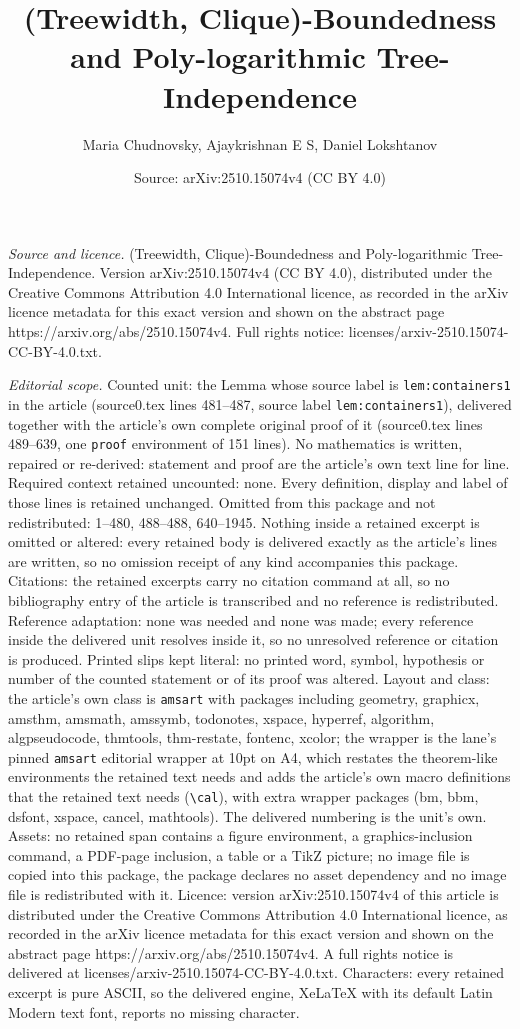 \documentclass[10pt,a4paper]{amsart}
\title[(Treewidth, Clique)-Boundedness and Poly-logarithmic Tree-In]{(Treewidth, Clique)-Boundedness and Poly-logarithmic Tree-Independence}
\author{Maria Chudnovsky, Ajaykrishnan E S, Daniel Lokshtanov}
\date{Source: arXiv:2510.15074v4 (CC BY 4.0)}
\begin{document}
\maketitle

\noindent\emph{Source and licence.} (Treewidth, Clique)-Boundedness and Poly-logarithmic Tree-Independence. Version arXiv:2510.15074v4 (CC BY 4.0), distributed under the Creative Commons Attribution 4.0 International licence, as recorded in the arXiv licence metadata for this exact version and shown on the abstract page https://arxiv.org/abs/2510.15074v4. Full rights notice: licenses/arxiv-2510.15074-CC-BY-4.0.txt.\par\smallskip

\noindent\textit{Editorial scope.} Counted unit: the Lemma whose source label is \texttt{lem:containers1} in the article (source0.tex lines 481--487, source label \texttt{lem:containers1}), delivered together with the article's own complete original proof of it (source0.tex lines 489--639, one \texttt{proof} environment of 151 lines). No mathematics is written, repaired or re-derived: statement and proof are the article's own text line for line. Required context retained uncounted: none. Every definition, display and label of those lines is retained unchanged. Omitted from this package and not redistributed: 1--480, 488--488, 640--1945. Nothing inside a retained excerpt is omitted or altered: every retained body is delivered exactly as the article's lines are written, so no omission receipt of any kind accompanies this package. Citations: the retained excerpts carry no citation command at all, so no bibliography entry of the article is transcribed and no reference is redistributed. Reference adaptation: none was needed and none was made; every reference inside the delivered unit resolves inside it, so no unresolved reference or citation is produced. Printed slips kept literal: no printed word, symbol, hypothesis or number of the counted statement or of its proof was altered. Layout and class: the article's own class is \texttt{amsart} with packages including geometry, graphicx, amsthm, amsmath, amssymb, todonotes, xspace, hyperref, algorithm, algpseudocode, thmtools, thm-restate, fontenc, xcolor; the wrapper is the lane's pinned \texttt{amsart} editorial wrapper at 10pt on A4, which restates the theorem-like environments the retained text needs and adds the article's own macro definitions that the retained text needs (\texttt{\textbackslash cal}), with extra wrapper packages (bm, bbm, dsfont, xspace, cancel, mathtools). The delivered numbering is the unit's own. Assets: no retained span contains a figure environment, a graphics-inclusion command, a PDF-page inclusion, a table or a TikZ picture; no image file is copied into this package, the package declares no asset dependency and no image file is redistributed with it. Licence: version arXiv:2510.15074v4 of this article is distributed under the Creative Commons Attribution 4.0 International licence, as recorded in the arXiv licence metadata for this exact version and shown on the abstract page https://arxiv.org/abs/2510.15074v4. A full rights notice is delivered at licenses/arxiv-2510.15074-CC-BY-4.0.txt. Characters: every retained excerpt is pure ASCII, so the delivered engine, XeLaTeX with its default Latin Modern text font, reports no missing character.
\end{document}
